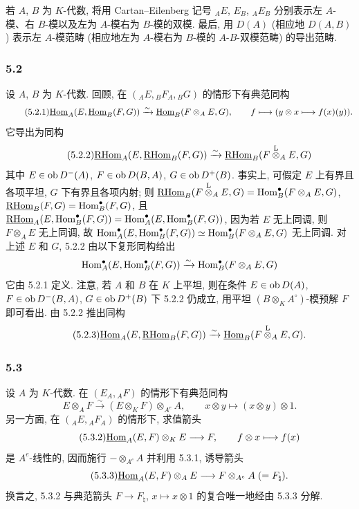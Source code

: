 若 $A$, $B$ 为 $K$-代数, 将用 Cartan--Eilenberg 记号 ${}_AE$, $E_B$, ${}_AE_B$ 分别表示左 $A$-模、右 $B$-模以及左为 $A$-模右为 $B$-模的双模. 最后, 用 $D(A)$ (相应地 $D(A,B)$) 表示左 $A$-模范畴 (相应地左为 $A$-模右为 $B$-模的 $A$-$B$-双模范畴) 的导出范畴.

\subsubsection*{5.2}

设 $A$, $B$ 为 $K$-代数. 回顾, 在 $({}_AE,{}_BF_A,{}_BG)$ 的情形下有典范同构
\begin{equation}\tag{5.2.1}
\underline{\operatorname{Hom}}_A(E,\underline{\operatorname{Hom}}_B(F,G))\xrightarrow{\sim}\underline{\operatorname{Hom}}_B(F\otimes_AE,G),\qquad
f\longmapsto (y\otimes x\longmapsto f(x)(y)).
\end{equation}
它导出为同构
\begin{equation}\tag{5.2.2}
\underline{\mathrm{RHom}}_A(E,\underline{\mathrm{RHom}}_B(F,G))\xrightarrow{\sim}\underline{\mathrm{RHom}}_B(F\overset{\mathrm L}{\otimes}_AE,G)
\end{equation}
其中 $E\in\operatorname{ob} D^-(A)$, $F\in\operatorname{ob} D(B,A)$, $G\in\operatorname{ob} D^+(B)$. 事实上, 可假定 $E$ 上有界且各项平坦, $G$ 下有界且各项内射; 则 $\underline{\mathrm{RHom}}_B(F\overset{\mathrm L}{\otimes}_AE,G)=\operatorname{Hom}_B^\bullet(F\otimes_AE,G)$, $\underline{\mathrm{RHom}}_B(F,G)=\operatorname{Hom}_B^\bullet(F,G)$, 且 $\underline{\mathrm{RHom}}_A(E,\operatorname{Hom}_B^\bullet(F,G))=\operatorname{Hom}_A^\bullet(E,\operatorname{Hom}_B^\bullet(F,G))$, 因为若 $E$ 无上同调, 则 $F\otimes_AE$ 无上同调, 故 $\operatorname{Hom}_A^\bullet(E,\operatorname{Hom}_B^\bullet(F,G))\simeq\operatorname{Hom}_B^\bullet(F\otimes_AE,G)$ 无上同调. 对上述 $E$ 和 $G$, 5.2.2 由以下复形同构给出
\[
\operatorname{Hom}_A^\bullet(E,\operatorname{Hom}_B^\bullet(F,G))\xrightarrow{\sim}\operatorname{Hom}_B^\bullet(F\otimes_AE,G)
\]
它由 5.2.1 定义. 注意, 若 $A$ 和 $B$ 在 $K$ 上平坦, 则在条件 $E\in\operatorname{ob} D(A)$, $F\in\operatorname{ob} D^-(B,A)$, $G\in\operatorname{ob} D^+(B)$ 下 5.2.2 仍成立, 用平坦 $(B\otimes_KA^\circ)$-模预解 $F$ 即可看出. 由 5.2.2 推出同构
\begin{equation}\tag{5.2.3}
\underline{\operatorname{Hom}}_A(E,\underline{\mathrm{RHom}}_B(F,G))\xrightarrow{\sim}\underline{\operatorname{Hom}}_B(F\overset{\mathrm L}{\otimes}_AE,G).
\end{equation}

\subsubsection*{5.3}

设 $A$ 为 $K$-代数. 在 $(E_A,{}_AF)$ 的情形下有典范同构
\begin{equation}\tag{5.3.1}
E\otimes_AF\xrightarrow{\sim}(E\otimes_KF)\otimes_{A^e}A,
\qquad x\otimes y\longmapsto (x\otimes y)\otimes 1.
\end{equation}
另一方面, 在 $({}_AE,{}_AF_A)$ 的情形下, 求值箭头
\begin{equation}\tag{5.3.2}
\underline{\operatorname{Hom}}_A(E,F)\otimes_KE\longrightarrow F,
\qquad f\otimes x\longmapsto f(x)
\end{equation}
是 $A^e$-线性的, 因而施行 $-\otimes_{A^e}A$ 并利用 5.3.1, 诱导箭头
\begin{equation}\tag{5.3.3}
\underline{\operatorname{Hom}}_A(E,F)\otimes_AE\longrightarrow F\otimes_{A^e}A\;(=F_\natural).
\end{equation}
换言之, 5.3.2 与典范箭头 $F\to F_\natural$, $x\mapsto x\otimes 1$ 的复合唯一地经由 5.3.3 分解.

